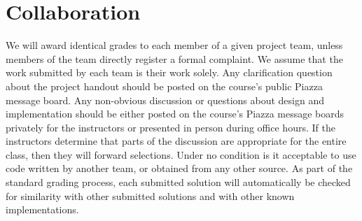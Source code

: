 \documentclass[12pt]{article}
\begin{document}
\section{Collaboration}
%
We will award identical grades to each member of a given project team,
unless members of the team directly register a formal complaint.
%
We assume that the work submitted by each team is their work solely.
% 
Any clarification question about the project handout should be posted
on the course's public Piazza message
board.
%
Any non-obvious discussion or questions about design and
implementation should be either posted on the course's Piazza message
boards privately for the instructors or presented in person during
office hours.
%
If the instructors determine that parts of the discussion are
appropriate for the entire class, then they will forward selections.
%
Under no condition is it acceptable to use code written by another
team, or obtained from any other source.
%
As part of the standard grading process, each submitted solution will
automatically be checked for similarity with other submitted solutions and with other known
implementations.
\end{document}

